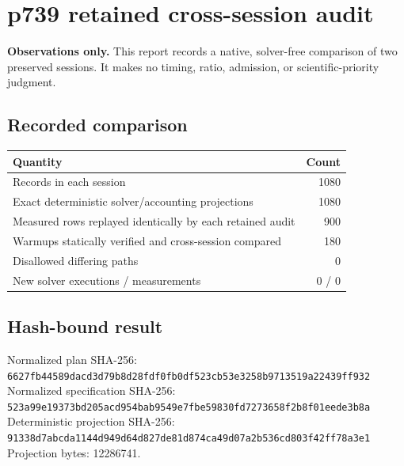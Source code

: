 \documentclass[10pt]{article}
\begin{document}
\section*{p739 retained cross-session audit}
\textbf{Observations only.} This report records a native, solver-free comparison of two preserved sessions. It makes no timing, ratio, admission, or scientific-priority judgment.

\subsection*{Recorded comparison}
\begin{tabular}{lr}
\toprule
Quantity & Count \\
\midrule
Records in each session & 1080 \\
Exact deterministic solver/accounting projections & 1080 \\
Measured rows replayed identically by each retained audit & 900 \\
Warmups statically verified and cross-session compared & 180 \\
Disallowed differing paths & 0 \\
New solver executions / measurements & 0 / 0 \\
\bottomrule
\end{tabular}


\subsection*{Hash-bound result}
Normalized plan SHA-256: \texttt{\footnotesize 6627fb44589dacd3d79b8d28fdf0fb0df523cb53e3258b9713519a22439ff932}\\
Normalized specification SHA-256: \texttt{\footnotesize 523a99e19373bd205acd954bab9549e7fbe59830fd7273658f2b8f01eede3b8a}\\
Deterministic projection SHA-256: \texttt{\footnotesize 91338d7abcda1144d949d64d827de81d874ca49d07a2b536cd803f42ff78a3e1}\\
Projection bytes: 12286741.
\end{document}
